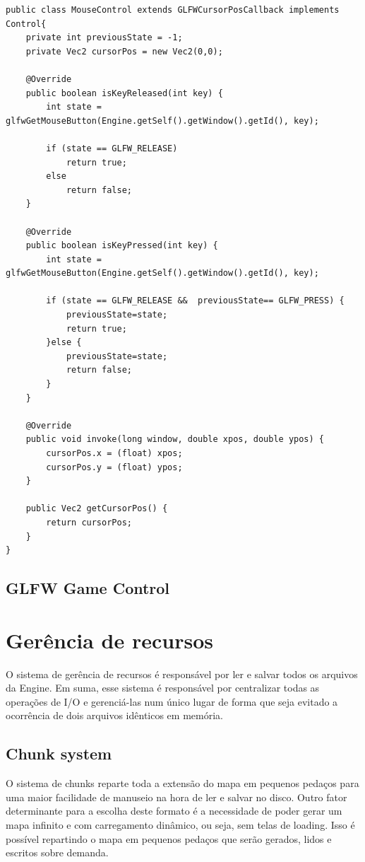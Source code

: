 \documentclass[12pt, 
openright, 
oneside, 
a4paper,    
brazil]{facom-ufu-abntex2}
\begin{document}
\begin{lstlisting}[caption=Mouse input]
public class MouseControl extends GLFWCursorPosCallback implements Control{
    private int previousState = -1;
    private Vec2 cursorPos = new Vec2(0,0);
     
    @Override
    public boolean isKeyReleased(int key) {
        int state = glfwGetMouseButton(Engine.getSelf().getWindow().getId(), key);
         
        if (state == GLFW_RELEASE) 
            return true;
        else
            return false;
    }
 
    @Override
    public boolean isKeyPressed(int key) {
        int state = glfwGetMouseButton(Engine.getSelf().getWindow().getId(), key);
         
        if (state == GLFW_RELEASE &&  previousState== GLFW_PRESS) {
            previousState=state;
            return true;
        }else {
            previousState=state;
            return false;
        }
    }
 
    @Override
    public void invoke(long window, double xpos, double ypos) {
        cursorPos.x = (float) xpos;
        cursorPos.y = (float) ypos;
    }
 
    public Vec2 getCursorPos() {
        return cursorPos;
    }
}
\end{lstlisting}

\subsection{GLFW Game Control}

\section{Gerência de recursos}
O sistema de gerência de recursos é responsável por ler e salvar todos os arquivos da Engine. Em suma, esse sistema é responsável por centralizar todas as operações de I/O e gerenciá-las num único lugar de forma que seja evitado a ocorrência de dois arquivos idênticos em memória.

\subsection{Chunk system}
O sistema de chunks reparte toda a extensão do mapa em pequenos pedaços para uma maior facilidade de manuseio na hora de ler e salvar no disco. Outro fator determinante para a escolha deste formato é a necessidade de poder gerar um mapa infinito e com carregamento dinâmico, ou seja, sem telas de loading. Isso é possível repartindo o mapa em pequenos pedaços que serão gerados, lidos e escritos sobre demanda.
\end{document}
